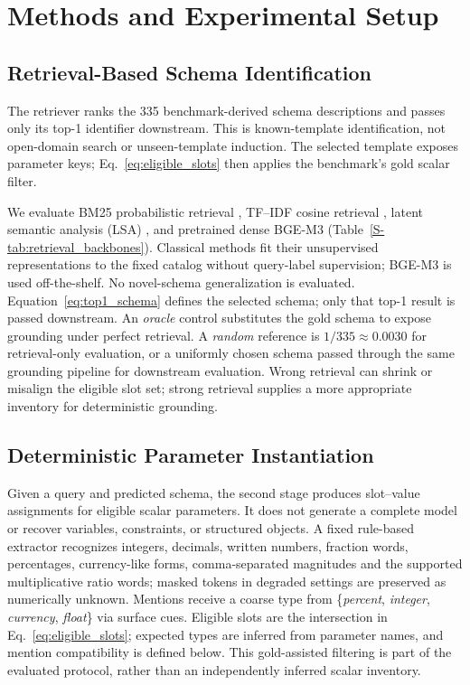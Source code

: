 \documentclass[pdflatex,iicol,sn-basic,Numbered]{sn-jnl}
\begin{document}
\section{Methods and Experimental Setup}
\label{sec:methodology}\label{sec:method}
\subsection{Retrieval-Based Schema Identification}
\label{subsec:method_retrieval}

The retriever ranks the 335 benchmark-derived schema descriptions and passes only its top-1 identifier downstream. This is known-template identification, not open-domain search or unseen-template induction. The selected template exposes parameter keys; Eq.~\eqref{eq:eligible_slots} then applies the benchmark's gold scalar filter.

We evaluate BM25 probabilistic retrieval \cite{robertson2009bm25}, TF--IDF cosine retrieval \cite{pedregosa2011sklearn}, latent semantic analysis (LSA) \cite{deerwester1990lsa}, and pretrained dense BGE-M3 \cite{chen2024m3embedding} (Table~\ref{S-tab:retrieval_backbones}). Classical methods fit their unsupervised representations to the fixed catalog without query-label supervision; BGE-M3 is used off-the-shelf. No novel-schema generalization is evaluated. Equation~\eqref{eq:top1_schema} defines the selected schema; only that top-1 result is passed downstream. An \emph{oracle} control substitutes the gold schema to expose grounding under perfect retrieval. A \emph{random} reference is $1/335 \approx 0.0030$ for retrieval-only evaluation, or a uniformly chosen schema passed through the same grounding pipeline for downstream evaluation. Wrong retrieval can shrink or misalign the eligible slot set; strong retrieval supplies a more appropriate inventory for deterministic grounding.



\subsection{Deterministic Parameter Instantiation}
\label{subsec:method_instantiation}

Given a query and predicted schema, the second stage produces slot--value assignments for eligible scalar parameters. It does not generate a complete model or recover variables, constraints, or structured objects. A fixed rule-based extractor recognizes integers, decimals, written numbers, fraction words, percentages, currency-like forms, comma-separated magnitudes and the supported multiplicative ratio words; masked tokens in degraded settings are preserved as numerically unknown. Mentions receive a coarse type from \{\emph{percent}, \emph{integer}, \emph{currency}, \emph{float}\} via surface cues. Eligible slots are the intersection in Eq.~\eqref{eq:eligible_slots}; expected types are inferred from parameter names, and mention compatibility is defined below. This gold-assisted filtering is part of the evaluated protocol, rather than an independently inferred scalar inventory.
\end{document}
